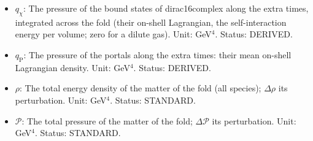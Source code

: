 \documentclass[
  10pt,
]{article}
\begin{document}
\begin{itemize}
\item
  \(q_\chi\): The pressure of the bound states of dirac16complex along
  the extra times, integrated across the fold (their on-shell
  Lagrangian, the self-interaction energy per volume; zero for a dilute
  gas). Unit: GeV\(^4\). Status: DERIVED.
\item
  \(q_{\mathrm{P}}\): The pressure of the portals along the extra times:
  their mean on-shell Lagrangian density. Unit: GeV\(^4\). Status:
  DERIVED.
\item
  \(\rho\): The total energy density of the matter of the fold (all
  species); \(\Delta\rho\) its perturbation. Unit: GeV\(^4\). Status:
  STANDARD.
\item
  \(\mathcal{P}\): The total pressure of the matter of the fold;
  \(\Delta\mathcal{P}\) its perturbation. Unit: GeV\(^4\). Status:
  STANDARD.
\end{itemize}
\end{document}
